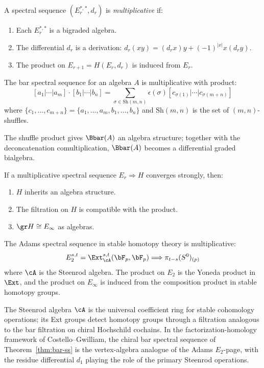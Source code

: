 \begin{definition}
\label{def:mult-ss}
A spectral sequence $(E_r^{*,*}, d_r)$ is \emph{multiplicative} if:
\begin{enumerate}[label=(\roman*)]
\item Each $E_r^{*,*}$ is a bigraded algebra.
\item The differential $d_r$ is a derivation: $d_r(xy) = (d_r x) y + (-1)^{|x|} x (d_r y)$.
\item The product on $E_{r+1} = H(E_r, d_r)$ is induced from $E_r$.
\end{enumerate}
\end{definition}

\begin{proposition}
\label{prop:bar-ss-mult}
The bar spectral sequence for an algebra $A$ is multiplicative with product:
\[
[a_1|\cdots|a_m] \cdot [b_1|\cdots|b_n] = \sum_{\sigma \in \mathrm{Sh}(m,n)}
\epsilon(\sigma) [c_{\sigma(1)}|\cdots|c_{\sigma(m+n)}]
\]
where $\{c_1, \ldots, c_{m+n}\} = \{a_1, \ldots, a_m, b_1, \ldots, b_n\}$ and
$\mathrm{Sh}(m,n)$ is the set of $(m,n)$-shuffles.

The shuffle product gives $\Bbar(A)$ an algebra structure; together with the deconcatenation comultiplication, $\Bbar(A)$ becomes a differential graded bialgebra.
\end{proposition}

\begin{theorem}
\label{thm:mult-ss-conv}
If a multiplicative spectral sequence $E_r \Rightarrow H$ converges strongly,
then:
\begin{enumerate}[label=(\roman*)]
\item $H$ inherits an algebra structure.
\item The filtration on $H$ is compatible with the product.
\item $\gr H \cong E_\infty$ as algebras.
\end{enumerate}
\end{theorem}

\begin{example}
\label{ex:adams-ss}
The Adams spectral sequence in stable homotopy theory is multiplicative:
\[
E_2^{s,t} = \Ext_{\cA}^{s,t}(\bF_p, \bF_p) \Longrightarrow \pi_{t-s}(S^0)_{(p)}
\]
where $\cA$ is the Steenrod algebra. The product on $E_2$ is the Yoneda product
in $\Ext$, and the product on $E_\infty$ is induced from the composition product
in stable homotopy groups.

The Steenrod algebra $\cA$ is the universal coefficient ring for stable
cohomology operations; its Ext groups detect homotopy groups through a
filtration analogous to the bar filtration on chiral Hochschild cochains.
In the factorization-homology framework of Costello--Gwilliam, the chiral
bar spectral sequence of Theorem~\ref{thm:bar-ss} is the vertex-algebra
analogue of the Adams $E_2$-page, with the residue differential $d_1$
playing the role of the primary Steenrod operations.
\end{example}
